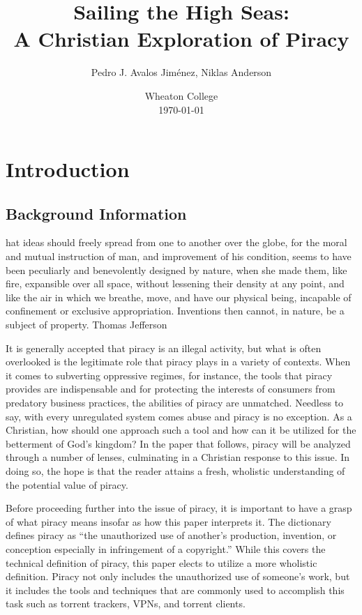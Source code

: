 \documentclass[onecolumn, 12pt]{article}
\title{Sailing the High Seas:\\ A Christian Exploration of Piracy}
\author{Pedro J. Avalos Jim\'enez, Niklas Anderson}
\date{Wheaton College\\\today}
\begin{document}
\maketitle

\section{Introduction}

\subsection{Background Information}

\begin{displayquote}
  hat ideas should freely spread from one to another over the globe,
  for the moral and mutual instruction of man, and improvement of his
  condition, seems to have been peculiarly and benevolently designed by nature,
  when she made them, like fire, expansible over all space, without lessening
  their density at any point, and like the air in which we breathe, move, and
  have our physical being, incapable of confinement or exclusive appropriation.
  Inventions then cannot, in nature, be a subject of property.
  Thomas Jefferson~\cite{barlow:wine}
\end{displayquote}
It is generally accepted that piracy is an illegal activity, but what is often overlooked
is the legitimate role that piracy plays in a variety of contexts. When it comes to
subverting oppressive regimes, for instance, the tools that piracy provides are
indispensable and for protecting the interests of consumers from predatory business
practices, the abilities of piracy are unmatched. Needless to say, with every unregulated
system comes abuse and piracy is no exception. As a Christian, how should one approach
such a tool and how can it be utilized for the betterment of God's kingdom? In the paper
that follows, piracy will be analyzed through a number of lenses, culminating in a
Christian response to this issue. In doing so, the hope is that the reader attains a
fresh, wholistic understanding of the potential value of piracy.

Before proceeding further into the issue of piracy, it is important to have a grasp of
what piracy means insofar as how this paper interprets it. The dictionary defines piracy
as ``the unauthorized use of another's production, invention, or conception especially in
infringement of a copyright.'' While this covers the technical definition of piracy, this
paper elects to utilize a more wholistic definition. Piracy not only includes the
unauthorized use of someone's work, but it includes the tools and techniques that are
commonly used to accomplish this task such as torrent trackers, VPNs, and torrent clients.
\end{document}
